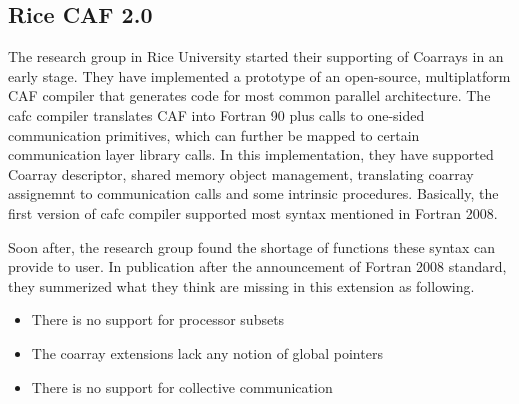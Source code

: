 \subsection{Rice CAF 2.0}\label{sec:caf2.0}
The research group in Rice University started their supporting of Coarrays in an early stage\cite{dotsenko2004multi}. They have implemented a prototype of an open-source, multiplatform CAF compiler that generates code for most common parallel architecture. The cafc compiler translates CAF into Fortran 90 plus calls to one-sided communication primitives, which can further be mapped to certain communication layer library calls. In this implementation, they have supported Coarray descriptor, shared memory object management,  translating coarray assignemnt to communication calls and some intrinsic procedures. Basically, the first version of cafc compiler supported most syntax mentioned in Fortran 2008. 

Soon after, the research group found the shortage of functions these syntax can provide to user. In publication\cite{mellor2009new} after the announcement of Fortran 2008 standard, they summerized what they think are missing in this extension as following.
\begin{itemize}
\item There is no support for processor subsets
\item The coarray extensions lack any notion of global pointers
\item There is no support for collective communication
\end{itemize}


